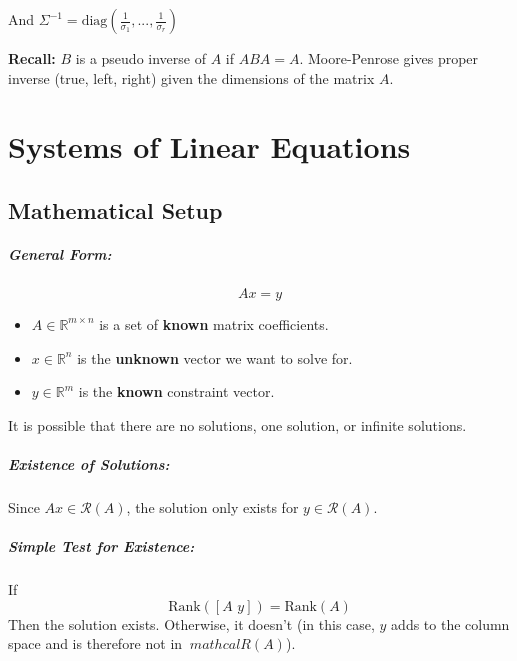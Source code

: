 \documentclass[a4paper,12pt]{report}
\begin{document}
And $\Sigma^{-1} = \text{diag}(\frac{1}{\sigma_1}, ..., \frac{1}{\sigma_r})$

\textbf{Recall: } $B$ is a pseudo inverse of $A$ if $ABA = A$. Moore-Penrose gives proper inverse (true, left, right) given the dimensions of the matrix $A$.

\chapter{Systems of Linear Equations}

\section{Mathematical Setup}

\paragraph{General Form:} 
\begin{equation}
		Ax = y
\end{equation}

\begin{itemize}
\item $A\in \mathbb{R}^{m\times n}$ is a set of \textbf{known} matrix coefficients.
\item $x\in \mathbb{R}^n$ is the \textbf{unknown} vector we want to solve for. 
\item $y\in \mathbb{R}^m$ is the \textbf{known} constraint vector.
\end{itemize}

It is possible that there are no solutions, one solution, or infinite solutions.

\paragraph{Existence of Solutions: } Since $Ax \in \mathcal{R}(A)$, the solution only exists for $y\in \mathcal{R}(A)$.

\paragraph{Simple Test for Existence: } If 
\begin{equation}
\text{Rank}([A\,\,y]) = \text{Rank}(A)
\end{equation}
Then the solution exists. Otherwise, it doesn't (in this case, $y$ adds to the column space and is therefore not in $\
mathcal{R}(A)$).
\end{document}
